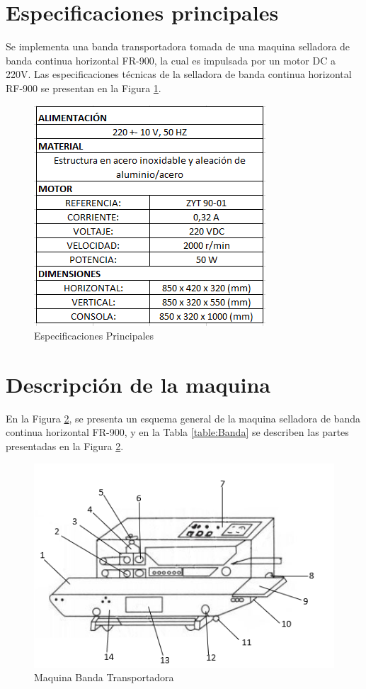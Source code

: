 	\section{Especificaciones principales}
		Se implementa una banda transportadora tomada de una maquina selladora de banda continua horizontal FR-900, la cual es impulsada por un motor DC a 220V.
		Las especificaciones técnicas de la selladora de banda continua horizontal RF-900 se presentan en la Figura \ref{fig:principales}.
		
		\begin{figure}[ht]
			\centering
			\includegraphics[scale=0.75]{Figs/13.png}
			\caption{Especificaciones Principales}
			\label{fig:principales}
		\end{figure}
		
	
	\newpage
	\section{Descripción de la maquina}
		En la Figura \ref{fig:Banda}, se presenta un esquema general de la maquina selladora de banda continua horizontal FR-900, y en la Tabla \ref{table:Banda} se describen las partes presentadas en la Figura \ref{fig:Banda}.
		\begin{figure}[ht]
			\centering
			\includegraphics[scale=0.95]{Figs/65.png}
			\caption{Maquina Banda Transportadora}
			\label{fig:Banda}
		\end{figure}
	

